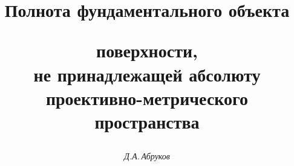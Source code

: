 

 


% 


 


\newcommand{\const}{\operatorname{const}} 


\newcommand{\myH}{\mathrm H} %


\newcommand{\eqdef}{\overset{\mathrm{def}}{=}{}} 


\newcommand{\tts}[1]{} 


 


 




\setcounter{page}{3} 












 


\author{\it Д.А.\,Абруков} 




\title{Полнота фундаментального объекта  


поверхности,\\ не принадлежащей абсолюту\\


проективно-метрического пространства} 


 


\date{} 




\pagestyle{plain} %


